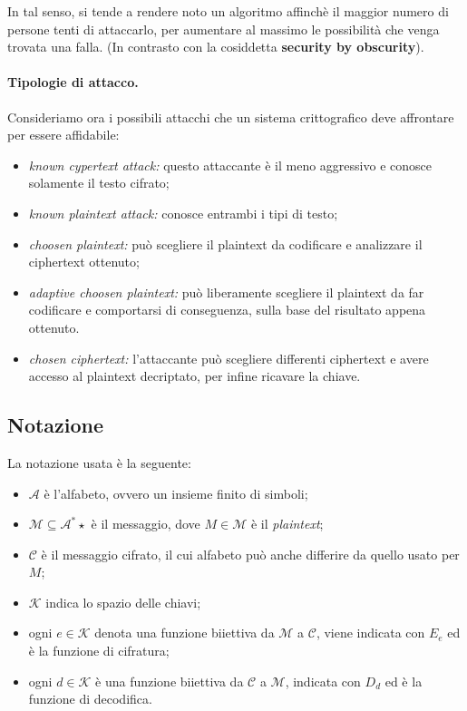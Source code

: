 \documentclass[a4paper, 10pt, twoside]{article}
\newcommand{\encr}{E_e}
\newcommand{\decr}{D_d}
\begin{document}
	In tal senso, si tende a rendere noto un algoritmo affinchè il maggior numero di persone tenti di attaccarlo, per aumentare al massimo le possibilità che venga trovata una falla. (In contrasto con la cosiddetta \textbf{security by obscurity}).
	
	\paragraph{Tipologie di attacco.}Consideriamo ora i possibili attacchi che un sistema crittografico deve affrontare per essere affidabile:
	\begin{itemize}
		\item \textit{known cypertext attack:} questo attaccante è il meno aggressivo e conosce solamente il testo cifrato;
		
		\item \textit{known plaintext attack:} conosce entrambi i tipi di testo;
		
		\item \textit{choosen plaintext:} può scegliere il plaintext da codificare e analizzare il ciphertext ottenuto;
		
		\item \textit{adaptive choosen plaintext:} può liberamente scegliere il plaintext da far codificare e comportarsi di conseguenza, sulla base del risultato appena ottenuto.
		
		\item \textit{chosen ciphertext:} l'attaccante può scegliere differenti ciphertext e avere accesso al plaintext decriptato, per infine ricavare la chiave.
		\end{itemize}
	
	\subsection{Notazione} \label{notation}
	La notazione usata è la seguente: \begin{itemize}
		\item $\mathcal{A}$ è l'alfabeto, ovvero un insieme finito di simboli;
		\item $\mathcal{M} \subseteq \mathcal{A}^*\star$ è il messaggio, dove $M \in \mathcal{M}$ è il \textit{plaintext};
		\item $\mathcal{C}$ è il messaggio cifrato, il cui alfabeto può anche differire da quello usato per $M$;
		\item $\mathcal{K}$ indica lo spazio delle chiavi;
		\item ogni $e \in \mathcal{K}$ denota una funzione biiettiva da $\mathcal{M}$ a $\mathcal{C}$, viene indicata con $\encr$ ed è la funzione di cifratura;
		\item ogni $d \in \mathcal{K}$ è una funzione biiettiva da $\mathcal{C}$ a $\mathcal{M}$, indicata con $\decr$ ed è la funzione di decodifica.
	\end{itemize}
\end{document}
